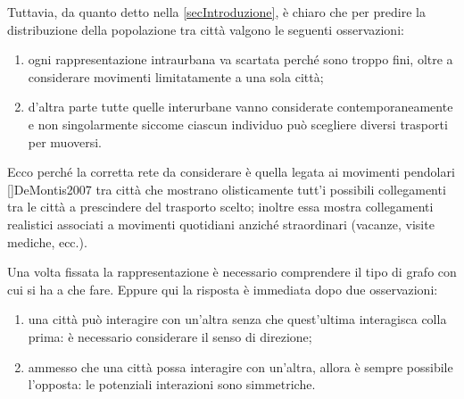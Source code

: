         Tuttavia, da quanto detto nella \cref{secIntroduzione}, è chiaro che per predire la distribuzione della popolazione tra città valgono le seguenti osservazioni:

        \begin{enumerate}[
            label=\arabic*.,
            topsep=0.5em,
            parsep=0em,
            itemsep=0.25em,
            leftmargin=2em,
            rightmargin=1.5em,
        ]
            \item ogni rappresentazione intraurbana va scartata perché sono troppo fini, oltre a considerare movimenti limitatamente a una sola città;
            \item d'altra parte tutte quelle interurbane vanno considerate contemporaneamente e non singolarmente siccome ciascun individuo può scegliere diversi trasporti per muoversi.
        \end{enumerate}

        Ecco perché la corretta rete da considerare è quella legata ai movimenti pendolari []{DeMontis2007} tra città che mostrano olisticamente tutt'i possibili collegamenti tra le città a prescindere del trasporto scelto; inoltre essa mostra collegamenti realistici associati a movimenti quotidiani anziché straordinari (vacanze, visite mediche, ecc.).

        Una volta fissata la rappresentazione è necessario comprendere il tipo di grafo con cui si ha a che fare. Eppure qui la risposta è immediata dopo due osservazioni:
       
        \begin{enumerate}[
            label=\arabic*.,
            topsep=0.5em,
            parsep=0em,
            itemsep=0.25em,
            leftmargin=2em,
            rightmargin=1.5em,
        ]
            \item una città può interagire con un'altra senza che quest'ultima interagisca colla prima: è necessario considerare il senso di direzione;
            \item ammesso che una città possa interagire con un'altra, allora è sempre possibile l'opposta: le potenziali interazioni sono simmetriche.
        \end{enumerate}
    
